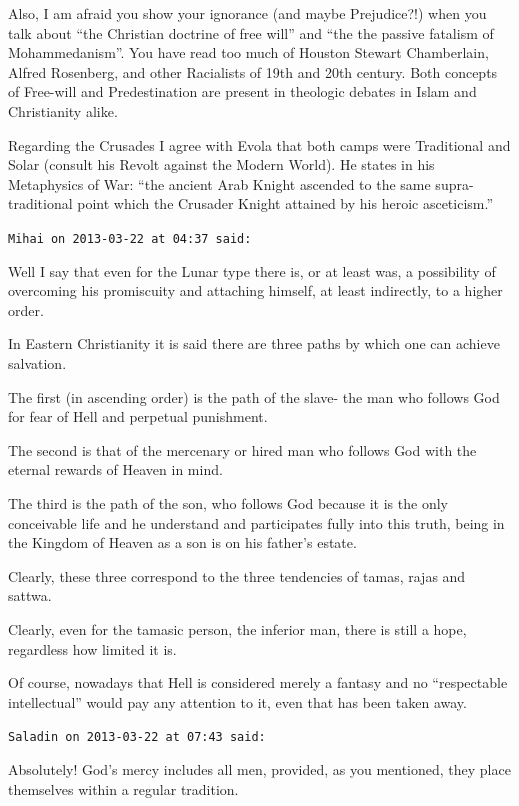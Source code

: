 \begin{footnotesize}
\begin{sffamily}
Also, I am afraid you show your ignorance (and maybe Prejudice?!) when you talk about ``the Christian doctrine of free will'' and ``the the passive fatalism of Mohammedanism''. You have read too much of Houston Stewart Chamberlain, Alfred Rosenberg, and other Racialists of 19th and 20th century. Both concepts of Free-will and Predestination are present in theologic debates in Islam and Christianity alike.

Regarding the Crusades I agree with Evola that both camps were Traditional and Solar (consult his Revolt against the Modern World). He states in his Metaphysics of War: ``the ancient Arab Knight ascended to the same supra-traditional point which the Crusader Knight attained by his heroic asceticism.''

\hfill

\texttt{Mihai on 2013-03-22 at 04:37 said:}

Well I say that even for the Lunar type there is, or at least was, a possibility of overcoming his promiscuity and attaching himself, at least indirectly, to a higher order.

In Eastern Christianity it is said there are three paths by which one can achieve salvation.

The first (in ascending order) is the path of the slave- the man who follows God for fear of Hell and perpetual punishment.

The second is that of the mercenary or hired man who follows God with the eternal rewards of Heaven in mind.

The third is the path of the son, who follows God because it is the only conceivable life and he understand and participates fully into this truth, being in the Kingdom of Heaven as a son is on his father's estate.

Clearly, these three correspond to the three tendencies of tamas, rajas and sattwa.

Clearly, even for the tamasic person, the inferior man, there is still a hope, regardless how limited it is.

Of course, nowadays that Hell is considered merely a fantasy and no ``respectable intellectual'' would pay any attention to it, even that has been taken away.

\hfill

\texttt{Saladin on 2013-03-22 at 07:43 said:}

Absolutely! God's mercy includes all men, provided, as you mentioned, they place themselves within a regular tradition.


\end{sffamily}
\end{footnotesize}
